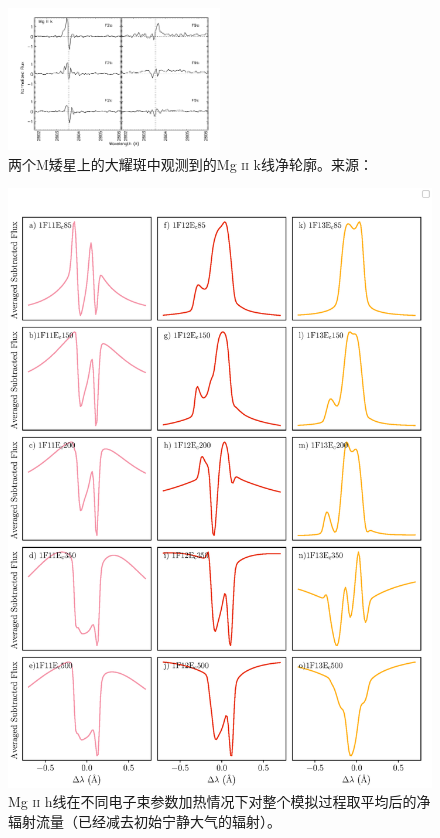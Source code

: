 \begin{figure}
	\centering
	\includegraphics[width=0.5\textwidth]{figs/Hawley2007}
	\caption{两个M矮星上的大耀斑中观测到的Mg \textsc{ii} k线净轮廓。来源：\textcites{Hawley2007}}
	\label{fig:4.10}
\end{figure}

\begin{figure}
	\centering
	\includegraphics[width=\textwidth]{figs/dMe_MgIIh_spec_aver}
	\caption{Mg \textsc{ii} h线在不同电子束参数加热情况下对整个模拟过程取平均后的净辐射流量（已经减去初始宁静大气的辐射）。}
	\label{fig:4.11}
\end{figure}





